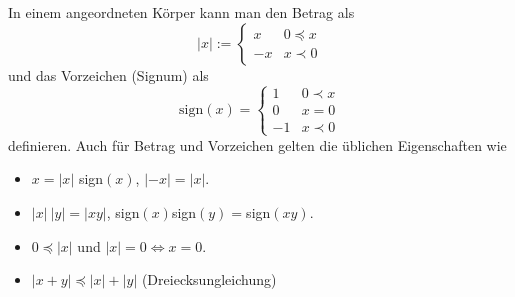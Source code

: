 In einem angeordneten Körper kann man den Betrag als
\begin{equation*}
\vert x \vert := \left\{ \begin{array}{rl} x & 0 \preceq x \\ -x & x \prec 0 \end{array} \right.
\end{equation*}
und das Vorzeichen (Signum) als
\begin{equation*}
\text{sign}(x) =  \left\{ \begin{array}{rl} 1 & 0 \prec  x \\ 0 & x =0\\-1 & x \prec 0 \end{array}\right.
\end{equation*}
definieren. Auch für Betrag und Vorzeichen gelten die üblichen Eigenschaften wie
\begin{itemize}
\item {} 
\(x = |x|\) sign\((x)\), \(|-x|=|x|\).

\item {} 
\(|x|~|y|=|xy|\), sign\((x)\)sign\((y) = \)sign\((xy)\).

\item {} 
\(0 \preceq |x|\) und \(|x|=0 \Leftrightarrow x =0\).

\item {} 
\(|x+y| \preceq |x|+|y|\) (Dreiecksungleichung)

\end{itemize}

